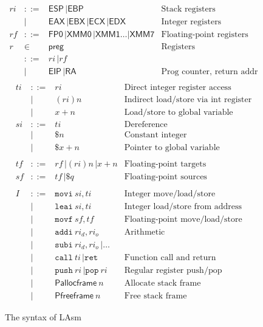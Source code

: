 \begin{figure}[t]\centering
\[
\begin{array}{llll}
\mathit{ri}  & ::= & \mathsf{ESP} \, | \mathsf{EBP} \, & \text{Stack registers} \\
& | & \mathsf{EAX} \, | \mathsf{EBX} \, | \mathsf{ECX} \, | \mathsf{EDX} & \text{Integer registers} \\
\mathit{rf} & ::= & \mathsf{FP0} \, | \mathsf{XMM0} \, | \mathsf{XMM1} \dots | \mathsf{XMM7} & \text{Floating-point registers} \\
r & \in & \textsf{preg} & \text{Registers} \\
 & ::= & \mathit{ri} \, | \mathit{rf} \\
& | & \mathsf{EIP} \, | \mathsf{RA} & \text{Prog counter, return addr} \\
\end{array}
\]
\[
\begin{array}{llll}
\mathit{ti} & ::= & \mathit{ri} & \text{Direct integer register access} \\
& | & (\mathit{ri})n & \text{Indirect load/store via int register} \\
& | & x+n & \text{Load/store to global variable} \\
\mathit{si} & ::= & \mathit{ti} & \text{Dereference} \\
& | & \$n & \text{Constant integer} \\
& | & \$x+n & \text{Pointer to global variable} \\
\\
\mathit{tf} & ::= & \mathit{rf} \, | (\mathit{ri})n \, | x+n & \text{Floating-point targets} \\
\mathit{sf} & ::= & \mathit{tf} \, | \$q \, & \text{Floating-point sources} \\
\\
\mathit{I} & ::= & \mathtt{movi} ~ \mathit{si}, \mathit{ti} & \text{Integer move/load/store} \\
& | & \mathtt{leai} ~ \mathit{si}, \mathit{ti} & \text{Integer load/store from address} \\
& | & \mathtt{movf} ~ \mathit{sf}, \mathit{tf} & \text{Floating-point move/load/store} \\
& | & \mathtt{addi} ~ \mathit{ri}_d, \mathit{ri}_o & \text{Arithmetic} \\
& | & \mathtt{subi} ~ \mathit{ri}_d, \mathit{ri}_o \, | \dots \\
& | & \mathtt{call} ~ \mathit{ti} \, | \mathtt{ret} & \text{Function call and return} \\
& | & \mathtt{push} ~ \mathit{ri} \, | \mathtt{pop} ~ \mathit{ri} & \text{Regular register push/pop} \\
& | & \mathsf{Pallocframe} ~ n & \text{Allocate stack frame} \\
& | & \mathsf{Pfreeframe} ~ n & \text{Free stack frame}
\end{array}
\]
\caption{The syntax of LAsm}
\label{fig:seq:lasm:syntax}
\hrulefill
\end{figure}


